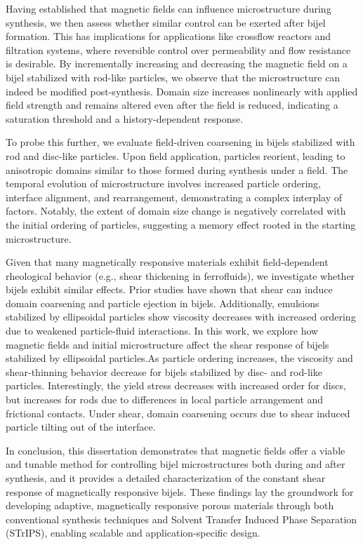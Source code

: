\begin{front}
    Having established that magnetic fields can influence microstructure during synthesis, we then assess whether similar control can be exerted 
    after bijel formation. This has implications for applications like crossflow reactors and filtration systems, where reversible control over 
    permeability and flow resistance is desirable. By incrementally increasing and decreasing the magnetic field on a bijel stabilized with 
    rod-like particles, we observe that the microstructure can indeed be modified post-synthesis. Domain size increases nonlinearly with 
    applied field strength and remains altered even after the field is reduced, indicating a saturation threshold and a history-dependent 
    response.
    
    To probe this further, we evaluate field-driven coarsening in bijels stabilized with rod and disc-like particles. Upon field application, 
    particles reorient, leading to anisotropic domains similar to those formed during synthesis under a field. The temporal evolution of 
    microstructure involves increased particle ordering, interface alignment, and rearrangement, demonstrating a complex interplay of factors. 
    Notably, the extent of domain size change is negatively correlated with the initial ordering of particles, suggesting a memory effect 
    rooted in the starting microstructure.
    
    Given that many magnetically responsive materials exhibit field-dependent rheological behavior (e.g., shear thickening in ferrofluids), 
    we investigate whether bijels exhibit similar effects. Prior studies have shown that shear can induce domain coarsening and particle 
    ejection in bijels. Additionally, emulsions stabilized by ellipsoidal particles show viscosity decreases with increased ordering due 
    to weakened particle-fluid interactions. In this work, we explore how magnetic fields and initial microstructure affect the shear 
    response of bijels stabilized by ellipsoidal particles.As particle ordering increases, the viscosity and shear-thinning behavior decrease for 
    bijels stabilized by disc- and rod-like particles. Interestingly, the yield stress decreases with increased order for discs, but increases for 
    rods due to differences in local particle arrangement and frictional contacts. Under shear, domain coarsening occurs due to shear induced particle 
    tilting out of the interface.
    
    In conclusion, this dissertation demonstrates that magnetic fields offer a viable and tunable method for controlling bijel microstructures both 
    during and after synthesis, and it provides a detailed characterization of the constant shear response of magnetically responsive bijels. These findings 
    lay the groundwork for developing adaptive, magnetically responsive porous materials through both conventional synthesis techniques and Solvent 
    Transfer Induced Phase Separation (STrIPS), enabling scalable and application-specific design.

\end{front}